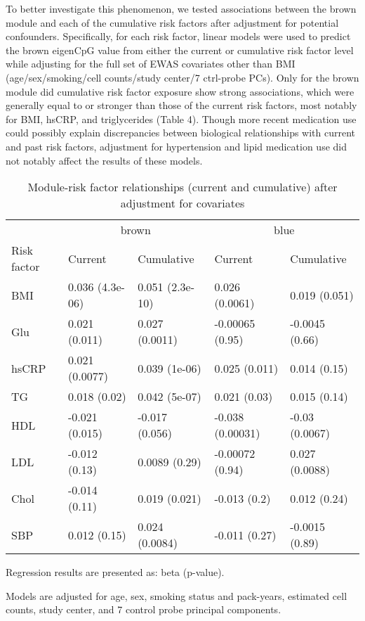 \documentclass[]{bmcart}
\theoremstyle{definition}
\theoremstyle{definition}
\theoremstyle{definition}
\theoremstyle{remark}
\begin{document}
To better investigate this phenomenon, we tested associations between
the brown module and each of the cumulative risk factors after
adjustment for potential confounders. Specifically, for each risk
factor, linear models were used to predict the brown eigenCpG value
from either the current or cumulative risk factor level while adjusting
for the full set of EWAS covariates other than BMI (age/sex/smoking/cell
counts/study center/7 ctrl-probe PCs). Only for the brown module did
cumulative risk factor exposure show strong associations, which were
generally equal to or stronger than those of the current risk factors,
most notably for BMI, hsCRP, and triglycerides (Table 4). Though more
recent medication use could possibly explain discrepancies between
biological relationships with current and past risk factors, adjustment
for hypertension and lipid medication use did not notably affect the
results of these models.

\begin{table}

\caption{\label{tab:cumulative-adjusted}Module-risk factor relationships (current and cumulative) after adjustment for covariates}
\centering
\begin{threeparttable}
\begin{tabular}[t]{lllll}
\toprule
\multicolumn{1}{c}{} & \multicolumn{2}{c}{brown} & \multicolumn{2}{c}{blue} \\
\cmidrule(l{2pt}r{2pt}){2-3} \cmidrule(l{2pt}r{2pt}){4-5}
Risk factor & Current & Cumulative & Current & Cumulative\\
\midrule
BMI & 0.036 (4.3e-06) & 0.051 (2.3e-10) & 0.026 (0.0061) & 0.019 (0.051)\\
Glu & 0.021 (0.011) & 0.027 (0.0011) & -0.00065 (0.95) & -0.0045 (0.66)\\
hsCRP & 0.021 (0.0077) & 0.039 (1e-06) & 0.025 (0.011) & 0.014 (0.15)\\
TG & 0.018 (0.02) & 0.042 (5e-07) & 0.021 (0.03) & 0.015 (0.14)\\
HDL & -0.021 (0.015) & -0.017 (0.056) & -0.038 (0.00031) & -0.03 (0.0067)\\
\addlinespace
LDL & -0.012 (0.13) & 0.0089 (0.29) & -0.00072 (0.94) & 0.027 (0.0088)\\
Chol & -0.014 (0.11) & 0.019 (0.021) & -0.013 (0.2) & 0.012 (0.24)\\
SBP & 0.012 (0.15) & 0.024 (0.0084) & -0.011 (0.27) & -0.0015 (0.89)\\
\bottomrule
\end{tabular}
\begin{tablenotes}
\item * Regression results are presented as: beta (p-value).
\item * Models are adjusted for age, sex, smoking status and pack-years, estimated cell counts, study center, and 7 control probe principal components.
\end{tablenotes}
\end{threeparttable}
\end{table}
\end{document}
